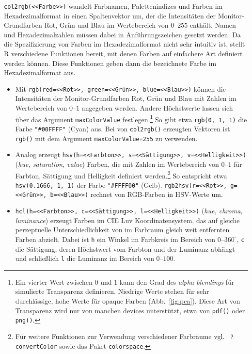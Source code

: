 \lstinline!col2rgb(<<Farbe>>)! wandelt Farbnamen, Palettenindizes und Farben im Hexadezimalformat in einen Spaltenvektor um, der die Intensitäten der Monitor-Grundfarben Rot, Grün und Blau im Wertebereich von $0$--$255$ enthält. Namen und Hexadezimalzahlen müssen dabei in Anführungszeichen gesetzt werden. Da die Spezifizierung von Farben im Hexadezimalformat nicht sehr intuitiv ist, stellt R verschiedene Funktionen bereit, mit denen Farben auf einfachere Art definiert werden können. Diese Funktionen geben dann die bezeichnete Farbe im Hexadezimalformat aus.

\begin{itemize}
\item Mit \lstinline!rgb(red=<<Rot>>, green=<<Grün>>, blue=<<Blau>>)! können die Intensitäten der Monitor-Grundfarben Rot, Grün und Blau mit Zahlen im Wertebereich von $0$--$1$ angegeben werden. Andere Höchstwerte lassen sich über das Argument \lstinline!maxColorValue! festlegen.\footnote{\label{ftn:transp}Ein vierter Wert zwischen $0$ und $1$ kann den Grad des \emph{alpha-blendings} für simulierte Transparenz definieren. Niedrige Werte stehen für sehr durchlässige, hohe Werte für opaque Farben (Abb.\ \ref{fig:pca}). Diese Art von Transparenz wird nur von manchen devices unterstützt, etwa von \lstinline!pdf()! oder \lstinline!png()!.} So gibt etwa \lstinline!rgb(0, 1, 1)! die Farbe \lstinline!"#00FFFF"! (Cyan) aus. Bei von \lstinline!col2rgb()! erzeugten Vektoren ist \lstinline!rgb()! mit dem Argument \lstinline!maxColorValue=255! zu verwenden.
\item Analog erzeugt \lstinline!hsv(h=<<Farbton>>, s=<<Sättigung>>, v=<<Helligkeit>>)! (\emph{hue, saturation, value}) Farben, die mit Zahlen im Wertebereich von $0$--$1$ für Farbton, Sättigung und Helligkeit definiert werden.\footnote{Für weitere Funktionen zur Verwendung verschiedener Farbräume vgl.\   \lstinline!?convertColor! sowie das Paket \lstinline!colorspace!.} So entspricht etwa \lstinline!hsv(0.1666, 1, 1)! der Farbe \lstinline!"#FFFF00"! (Gelb). \lstinline!rgb2hsv(r=<<Rot>>, g=<<Grün>>, b=<<Blau>>)! rechnet von RGB-Farben in HSV-Werte um.
\item \lstinline!hcl(h=<<Farbton>>, c=<<Sättigung>>, l=<<Helligkeit>>)! (\emph{hue, chroma, luminance}) erzeugt Farben im CIE Luv Koordinatensystem, das auf gleiche perzeptuelle Unterschiedlichkeit von im Farbraum gleich weit entfernten Farben abzielt. Dabei ist \lstinline!h! ein Winkel im Farbkreis im Bereich von $0$--$360^{\circ}$, \lstinline!c! die Sättigung, deren Höchstwert vom Farbton und der Luminanz abhängt und schließlich \lstinline!l! die Luminanz im Bereich von $0$--$100$.

\end{itemize}
